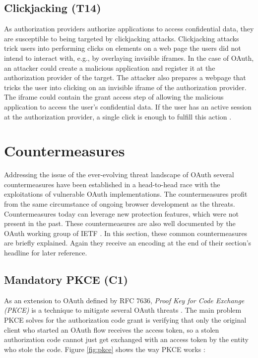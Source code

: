 \documentclass[
    fontsize=12pt,
    headings=small,
    parskip=half,           %
    bibliography=totoc,
    numbers=noenddot,       %
    open=any,               %
    ]{scrreprt}
\begin{document}
\subsection[Clickjacking]{Clickjacking (T14)}
\label{threat:T14}
As authorization providers authorize applications to access confidential data, they are susceptible to being targeted by clickjacking attacks. Clickjacking attacks trick users into performing clicks on elements on a web page the users did not intend to interact with, e.g., by overlaying invisible iframes. In the case of OAuth, an attacker could create a malicious application and register it at the authorization provider of the target. The attacker also prepares a webpage that tricks the user into clicking on an invisible iframe of the authorization provider. The iframe could contain the grant access step of allowing the malicious application to access the user's confidential data. If the user has an active session at the authorization provider, a single click is enough to fulfill this action \cite{gibbons2014security}. 


\section{Countermeasures}
\label{sec:oauth_countermeasures}
Addressing the issue of the ever-evolving threat landscape of OAuth several countermeasures have been established in a head-to-head race with the exploitations of vulnerable OAuth implementations. The countermeasures profit from the same circumstance of ongoing browser development as the threats. Countermeasures today can leverage new protection features, which were not present in the past. These countermeasures are also well documented by the OAuth working group of IETF \cite{lodderstedt2020oauth}. In this section, these common countermeasures are briefly explained. Again they receive an encoding at the end of their section's headline for later reference.

\subsection[Mandatory PKCE]{Mandatory PKCE (C1)}
\label{counter:C1}
As an extension to OAuth defined by RFC 7636, \emph{Proof Key for Code Exchange (PKCE)} is a technique to mitigate several OAuth threats \cite{bradley2015rfc}. The main problem PKCE solves for the authorization code grant is verifying that only the original client who started an OAuth flow receives the access token, so a stolen authorization code cannot just get exchanged with an access token by the entity who stole the code. Figure \ref{fig:pkce} shows the way PKCE works \cite{siriwardena_oauth_2020}:
\end{document}
